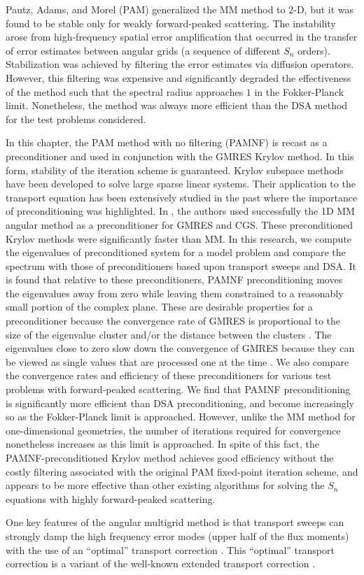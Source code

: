 Pautz, Adams, and Morel (PAM) \cite{multigrid_2d} generalized the MM method to
2-D, but it was found to be stable only for weakly forward-peaked scattering.
The instability arose from high-frequency spatial error amplification that
occurred in the transfer of error estimates between angular grids (a sequence
of different $S_n$ orders). Stabilization was achieved by filtering the error
estimates via diffusion operators. However, this filtering was expensive and
significantly degraded the effectiveness of the method such that the spectral
radius approaches $1$ in the Fokker-Planck limit.  Nonetheless, the method was 
always more efficient than the DSA method for the test problems considered.

In this chapter, the PAM method with no filtering (PAMNF) is recast as a 
preconditioner and used in conjunction with the GMRES Krylov method. In this form, 
stability of the iteration scheme is guaranteed. Krylov subspace methods have been 
developed to solve large sparse linear systems. Their application to the transport 
equation has been extensively studied in the past \cite{faber,oliveira,patton,warsa} 
where the importance of preconditioning was highlighted. In \cite{oliveira}, the 
authors used successfully the 1D MM angular method as a preconditioner for GMRES 
and CGS. These preconditioned Krylov methods were significantly faster than MM. 
In this research, we compute the eigenvalues of preconditioned system for a model 
problem and compare the spectrum with those of preconditioners based upon transport 
sweeps and DSA. It is found that relative to these preconditioners, PAMNF 
preconditioning moves the eigenvalues away from zero while leaving them 
constrained to a reasonably small portion of the complex plane. These are 
desirable properties for a preconditioner because the convergence rate of GMRES 
is proportional to the size of the eigenvalue cluster and/or the distance between 
the clusters \cite{campbell,warsa}. The eigenvalues close to zero slow down the 
convergence of GMRES because they can be viewed as single values that are processed 
one at the time \cite{campbell,warsa}. We also compare the convergence rates and 
efficiency of these preconditioners for various test problems with forward-peaked 
scattering. We find that PAMNF preconditioning is significantly more efficient 
than DSA preconditioning, and become increasingly so as the Fokker-Planck limit 
is approached. However, unlike the MM method for one-dimensional geometries, 
the number of iterations required for convergence 
nonetheless increases as this limit is approached. In spite of this fact, 
the PAMNF-preconditioned Krylov method achieves good efficiency without the 
costly filtering associated with the original PAM fixed-point iteration scheme, 
and appears to be more effective than other existing algorithms for solving 
the $S_n$ equations with highly forward-peaked scattering.

One key features of the angular multigrid method is that transport sweeps can
strongly damp the high frequency error modes (upper half of the flux moments)
with the use of an ``optimal'' transport correction \cite{multigrid_1d}. This
``optimal'' transport correction is a variant of the well-known extended
transport correction \cite{lathrop,morel_79}.

